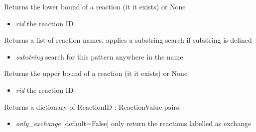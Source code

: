 \documentclass[a4paper,11pt,english]{sphinxmanual}
\begin{document}
\begin{fulllineitems}
\begin{fulllineitems}
\begin{itemize}
\end{itemize}

\end{fulllineitems}


\begin{fulllineitems}
\label{modules_doc:cbmpy.CBModel.Model.getReactionLowerBound}
Returns the lower bound of a reaction (it it exists) or None
\begin{itemize}
\item {} 
\emph{rid} the reaction ID

\end{itemize}

\end{fulllineitems}


\begin{fulllineitems}
\label{modules_doc:cbmpy.CBModel.Model.getReactionNames}
Returns a list of reaction names, applies a substring search if substring is defined
\begin{itemize}
\item {} 
\emph{substring} search for this pattern anywhere in the name

\end{itemize}

\end{fulllineitems}


\begin{fulllineitems}
\label{modules_doc:cbmpy.CBModel.Model.getReactionUpperBound}
Returns the upper bound of a reaction (it it exists) or None
\begin{itemize}
\item {} 
\emph{rid} the reaction ID

\end{itemize}

\end{fulllineitems}


\begin{fulllineitems}
\label{modules_doc:cbmpy.CBModel.Model.getReactionValues}
Returns a dictionary of ReactionID : ReactionValue pairs:
\begin{itemize}
\item {} 
\emph{only\_exchange} {[}default=False{]} only return the reactions labelled as exchange


\end{itemize}
\end{fulllineitems}
\end{fulllineitems}
\end{document}
